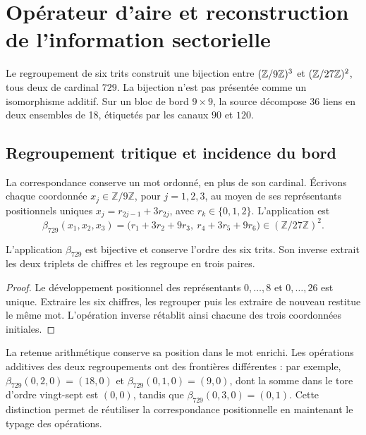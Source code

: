 \section{Opérateur d'aire et reconstruction de l'information sectorielle}
\label{v:ant:sec:area}
Le regroupement de six trits construit une bijection entre
$(\mathbb Z/9\mathbb Z)^3$ et $(\mathbb Z/27\mathbb Z)^2$, tous deux de cardinal $729$.
La bijection n'est pas présentée comme un isomorphisme additif. Sur un bloc
de bord $9\times9$, la source décompose 36 liens en deux
ensembles de 18, étiquetés par les canaux $90$ et $120$.

\subsection{Regroupement tritique et incidence du bord}
\label{v:ant:sec:ii-area-incidencia-explicita}

La correspondance conserve un mot ordonné, en plus de son cardinal.
Écrivons chaque coordonnée \(x_j\in\mathbb Z/9\mathbb Z\), pour
\(j=1,2,3\), au moyen de ses représentants positionnels uniques
\(x_j=r_{2j-1}+3r_{2j}\), avec \(r_k\in\{0,1,2\}\). L'application est
\begin{equation}
 \beta_{729}(x_1,x_2,x_3)
 =\bigl(r_1+3r_2+9r_3,\ r_4+3r_5+9r_6\bigr)
 \in(\mathbb Z/27\mathbb Z)^2.
 \label{v:ant:eq:ii-area-beta729}
\end{equation}

\begin{proposition}
\label{v:ant:prop:ii-area-beta729}
L'application \(\beta_{729}\) est bijective et conserve l'ordre des
six trits. Son inverse extrait les deux triplets de chiffres et les regroupe
en trois paires.
\end{proposition}
\begin{proof}
Le développement positionnel des représentants \(0,\ldots,8\) et
\(0,\ldots,26\) est unique. Extraire les six chiffres, les regrouper puis
les extraire de nouveau restitue le même mot. L'opération inverse
rétablit ainsi chacune des trois coordonnées initiales.
\end{proof}

La retenue arithmétique conserve sa position dans le mot enrichi. Les opérations
additives des deux regroupements ont des frontières différentes : par exemple,
\(\beta_{729}(0,2,0)=(18,0)\) et
\(\beta_{729}(0,1,0)=(9,0)\), dont la somme dans le tore d'ordre
vingt-sept est \((0,0)\), tandis que
\(\beta_{729}(0,3,0)=(0,1)\). Cette distinction permet de réutiliser
la correspondance positionnelle en maintenant le typage des opérations.

